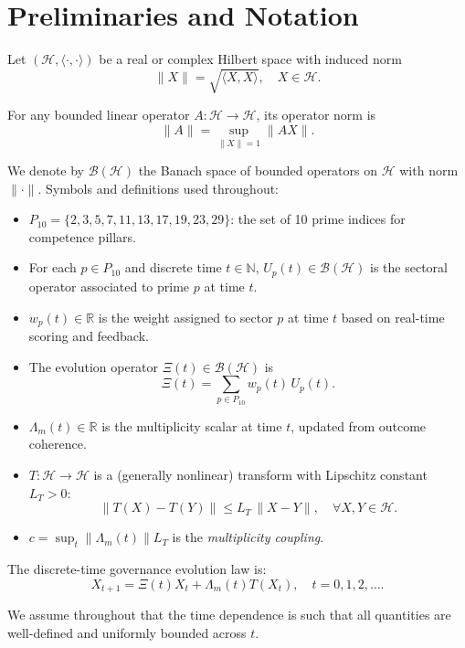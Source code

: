 \documentclass[11pt]{article}
\begin{document}
\section{Preliminaries and Notation}

Let \((\mathcal{H}, \langle \cdot, \cdot \rangle)\) be a real or complex Hilbert space with induced norm
\[
  \|X\| = \sqrt{\langle X, X \rangle}, \quad X \in \mathcal{H}.
\]

For any bounded linear operator \(A : \mathcal{H} \to \mathcal{H}\), its operator norm is
\[
  \|A\| = \sup_{\|X\| = 1} \|A X\|.
\]

We denote by \(\mathcal{B}(\mathcal{H})\) the Banach space of bounded operators on \(\mathcal{H}\) with norm \(\|\cdot\|\). Symbols and definitions used throughout:

\begin{itemize}
  \item \(P_{10} = \{2,3,5,7,11,13,17,19,23,29\}\): the set of 10 prime indices for competence pillars.
  \item For each \(p \in P_{10}\) and discrete time \(t \in \mathbb{N}\), \(U_p(t) \in \mathcal{B}(\mathcal{H})\) is the sectoral operator associated to prime \(p\) at time \(t\).
  \item \(w_p(t) \in \mathbb{R}\) is the weight assigned to sector \(p\) at time \(t\) based on real-time scoring and feedback.
  \item The evolution operator \(\Xi(t) \in \mathcal{B}(\mathcal{H})\) is
  \[
    \Xi(t) = \sum_{p \in P_{10}} w_p(t) \, U_p(t).
  \]
  \item \(\Lambda_m(t) \in \mathbb{R}\) is the multiplicity scalar at time \(t\), updated from outcome coherence.
  \item \(T : \mathcal{H} \to \mathcal{H}\) is a (generally nonlinear) transform with Lipschitz constant \(L_T > 0\):
  \[
    \|T(X) - T(Y)\| \leq L_T \, \|X - Y\|, \quad \forall X, Y \in \mathcal{H}.
  \]
  \item \(c = \sup_t \|\Lambda_m(t)\| L_T\) is the \emph{multiplicity coupling}.
\end{itemize}

The discrete-time governance evolution law is:
\begin{equation}\label{eq:evolution}
  X_{t+1} = \Xi(t) X_t + \Lambda_m(t) T(X_t), \quad t = 0,1,2,\dots.
\end{equation}

We assume throughout that the time dependence is such that all quantities are well-defined and uniformly bounded across \(t\).
\end{document}
